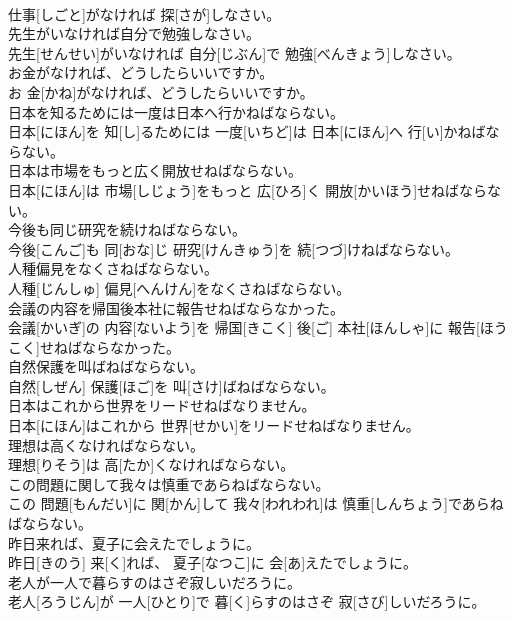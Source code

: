 \documentclass[8pt]{extreport}
\begin{document}
\begin{CJK}{UTF8}{min}
\\	仕事[しごと]がなければ 探[さが]しなさい。
\\	先生がいなければ自分で勉強しなさい。	
\\	先生[せんせい]がいなければ 自分[じぶん]で 勉強[べんきょう]しなさい。
\\	お金がなければ、どうしたらいいですか。	
\\	お 金[かね]がなければ、どうしたらいいですか。
\\	日本を知るためには一度は日本へ行かねばならない。	
\\	日本[にほん]を 知[し]るためには 一度[いちど]は 日本[にほん]へ 行[い]かねばならない。
\\	日本は市場をもっと広く開放せねばならない。	
\\	日本[にほん]は 市場[しじょう]をもっと 広[ひろ]く 開放[かいほう]せねばならない。
\\	今後も同じ研究を続けねばならない。	
\\	今後[こんご]も 同[おな]じ 研究[けんきゅう]を 続[つづ]けねばならない。
\\	人種偏見をなくさねばならない。	
\\	人種[じんしゅ] 偏見[へんけん]をなくさねばならない。
\\	会議の内容を帰国後本社に報告せねばならなかった。	
\\	会議[かいぎ]の 内容[ないよう]を 帰国[きこく] 後[ご] 本社[ほんしゃ]に 報告[ほうこく]せねばならなかった。
\\	自然保護を叫ばねばならない。	
\\	自然[しぜん] 保護[ほご]を 叫[さけ]ばねばならない。
\\	日本はこれから世界をリードせねばなりません。	
\\	日本[にほん]はこれから 世界[せかい]をリードせねばなりません。
\\	理想は高くなければならない。	
\\	理想[りそう]は 高[たか]くなければならない。
\\	この問題に関して我々は慎重であらねばならない。	
\\	この 問題[もんだい]に 関[かん]して 我々[われわれ]は 慎重[しんちょう]であらねばならない。
\\	昨日来れば、夏子に会えたでしょうに。	
\\	昨日[きのう] 来[く]れば、 夏子[なつこ]に 会[あ]えたでしょうに。
\\	老人が一人で暮らすのはさぞ寂しいだろうに。	
\\	老人[ろうじん]が 一人[ひとり]で 暮[く]らすのはさぞ 寂[さび]しいだろうに。

\end{CJK}
\end{document}
